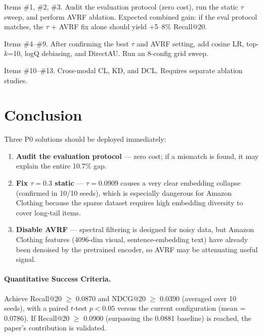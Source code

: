 \documentclass[11pt,a4paper]{article}
\begin{document}
\begin{description}[leftmargin=0pt, style=nextline]
\item[Phase 1 --- Quick Win ($<$ 1 day).] Items \#1, \#2, \#3. Audit the evaluation protocol (zero cost), run the static $\tau$ sweep, and perform AVRF ablation. Expected combined gain: if the eval protocol matches, the $\tau$ + AVRF fix alone should yield +5--8\% Recall@20.

\item[Phase 2 --- Medium ($<$ 1 week).] Items \#4--\#9. After confirming the best $\tau$ and AVRF setting, add cosine LR, top-$k$=10, logQ debiasing, and DirectAU. Run an 8-config grid sweep.

\item[Phase 3 --- Deep ($<$ 1 month).] Items \#10--\#13. Cross-modal CL, KD, and DCL. Requires separate ablation studies.
\end{description}

\section{Conclusion}

Three P0 solutions should be deployed immediately:
\begin{enumerate}
    \item \textbf{Audit the evaluation protocol} --- zero cost; if a mismatch is found, it may explain the entire 10.7\% gap.
    \item \textbf{Fix $\tau = 0.3$ static} --- $\tau = 0.0909$ causes a very clear embedding collapse (confirmed in 10/10 seeds), which is especially dangerous for Amazon Clothing because the sparse dataset requires high embedding diversity to cover long-tail items.
    \item \textbf{Disable AVRF} --- spectral filtering is designed for noisy data, but Amazon Clothing features (4096-dim visual, sentence-embedding text) have already been denoised by the pretrained encoder, so AVRF may be attenuating useful signal.
\end{enumerate}

\paragraph{Quantitative Success Criteria.}
Achieve Recall@20 $\geq$ 0.0870 and NDCG@20 $\geq$ 0.0390 (averaged over 10 seeds), with a paired $t$-test $p < 0.05$ versus the current configuration (mean = 0.0786). If Recall@20 $\geq$ 0.0900 (surpassing the 0.0881 baseline) is reached, the paper's contribution is validated.
\end{document}
